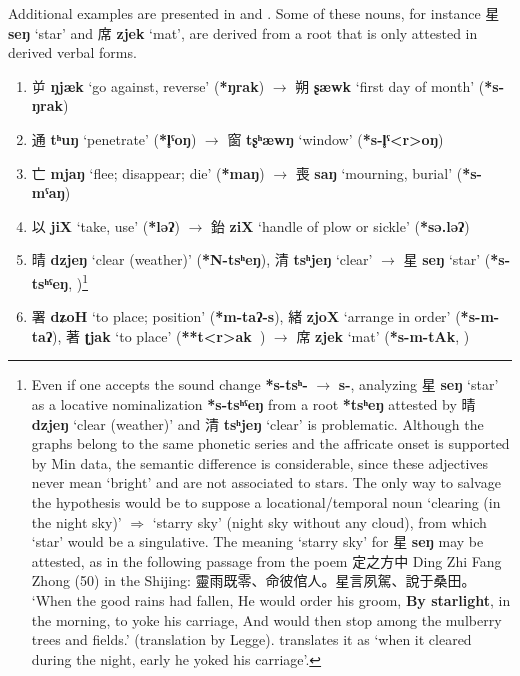 \documentclass[oneside,a4paper,11pt]{article}
\newcommand{\ipa}[1]{\textbf{{\phon\mbox{#1}}}} %
\newcommand{\zh}[1]{{\cn #1}}
\newcommand{\zhc}[2]{\zh{#1} \ipa{#2}}
\begin{document}
Additional examples are presented in \citet[56]{bs14oc} and \citealt{sagart12sprefix}. Some of these nouns, for instance \zhc{星}{seŋ} `star’ and \zhc{席}{zjek} `mat’, are derived from a root that is only attested in derived verbal forms.

\begin{enumerate}
\item \zhc{屰}{ŋjæk} ‘go against, reverse’ (\ipa{*ŋrak})  $\rightarrow$ \zhc{朔}{ʂæwk} ‘first day of month’  (\ipa{*s-ŋrak})
\item \zhc{通}{tʰuŋ} ‘penetrate’ (\ipa{*l̥ˤoŋ}) $\rightarrow$ \zhc{窗}{tʂʰæwŋ} ‘window’ (\ipa{*s-l̥ˤ<r>oŋ})
\item \zhc{亡}{mjaŋ} ‘flee; disappear; die’ (\ipa{*maŋ}) $\rightarrow$ \zhc{喪}{saŋ} ‘mourning, burial’ (\ipa{*s-mˤaŋ})
\item \zhc{以}{jiX} ‘take, use’ (\ipa{*ləʔ}) $\rightarrow$ \zhc{鈶}{ziX} ‘handle of plow or sickle’ (\ipa{*sə.ləʔ})
\item \zhc{晴}{dzjeŋ} ‘clear (weather)’ (\ipa{*N-tsʰeŋ}), \zhc{清}{tsʰjeŋ} ‘clear'  $\rightarrow$ \zhc{星}{seŋ} `star’ (\ipa{*s-tsʰˤeŋ},  \citealt[139]{bs14oc})\footnote{Even if one accepts the sound change \ipa{*s-tsʰ-} $\rightarrow$ \ipa{s-}, analyzing \zhc{星}{seŋ} `star’ as a locative nominalization \ipa{*s-tsʰˤeŋ} from a root \ipa{*tsʰeŋ} attested by \zhc{晴}{dzjeŋ} ‘clear (weather)’ and \zhc{清}{tsʰjeŋ} ‘clear' is problematic. Although the graphs belong to the same phonetic series and the affricate onset is supported by Min data, the semantic difference is considerable, since these adjectives never mean `bright' and are not associated to stars. The only way to salvage the hypothesis would be to suppose a locational/temporal noun `clearing (in the night sky)' $\Rightarrow$ `starry sky' (night sky without any cloud), from which `star' would be a singulative.
The meaning `starry sky' for \zhc{星}{seŋ} may be attested, as in the following passage from the poem \zh{定之方中} Ding Zhi Fang Zhong (50) in the Shijing: \zh{靈雨既零、命彼倌人。星言夙駕、說于桑田。} `When the good rains had fallen, He would order his groom, \textbf{By starlight}, in the morning, to yoke his carriage, And would then stop among the mulberry trees and fields.' (translation by Legge). \citet[33]{karlgren74odes} translates it as `when it cleared during the night, early he yoked his carriage'. } 
\item \zhc{署}{dʑoH} ‘to place; position’ (\ipa{*m-taʔ-s}),  \zhc{緒}{zjoX} ‘arrange in order’ (\ipa{*s-m-taʔ}),  \zhc{著}{ʈjak} ‘to place’ (\ipa{**t<r>ak }) $\rightarrow$  \zhc{席}{zjek} `mat’ (\ipa{*s-m-tAk},  \citealt[61]{bs14oc})

\end{enumerate}
\end{document}
